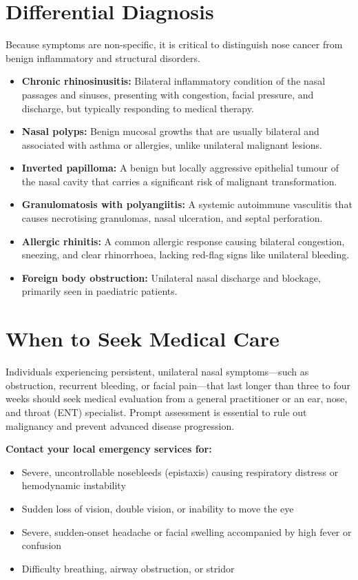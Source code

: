 \section*{Differential Diagnosis}
Because symptoms are non-specific, it is critical to distinguish nose cancer from benign inflammatory and structural disorders.
\begin{itemize}
    \item \textbf{Chronic rhinosinusitis:} Bilateral inflammatory condition of the nasal passages and sinuses, presenting with congestion, facial pressure, and discharge, but typically responding to medical therapy.
    \item \textbf{Nasal polyps:} Benign mucosal growths that are usually bilateral and associated with asthma or allergies, unlike unilateral malignant lesions.
    \item \textbf{Inverted papilloma:} A benign but locally aggressive epithelial tumour of the nasal cavity that carries a significant risk of malignant transformation.
    \item \textbf{Granulomatosis with polyangiitis:} A systemic autoimmune vasculitis that causes necrotising granulomas, nasal ulceration, and septal perforation.
    \item \textbf{Allergic rhinitis:} A common allergic response causing bilateral congestion, sneezing, and clear rhinorrhoea, lacking red-flag signs like unilateral bleeding.
    \item \textbf{Foreign body obstruction:} Unilateral nasal discharge and blockage, primarily seen in paediatric patients.
\end{itemize}

\section*{When to Seek Medical Care}
Individuals experiencing persistent, unilateral nasal symptoms—such as obstruction, recurrent bleeding, or facial pain—that last longer than three to four weeks should seek medical evaluation from a general practitioner or an ear, nose, and throat (ENT) specialist. Prompt assessment is essential to rule out malignancy and prevent advanced disease progression.

\textbf{Contact your local emergency services for:}
\begin{itemize}
    \item Severe, uncontrollable nosebleeds (epistaxis) causing respiratory distress or hemodynamic instability
    \item Sudden loss of vision, double vision, or inability to move the eye
    \item Severe, sudden-onset headache or facial swelling accompanied by high fever or confusion
    \item Difficulty breathing, airway obstruction, or stridor
\end{itemize}

